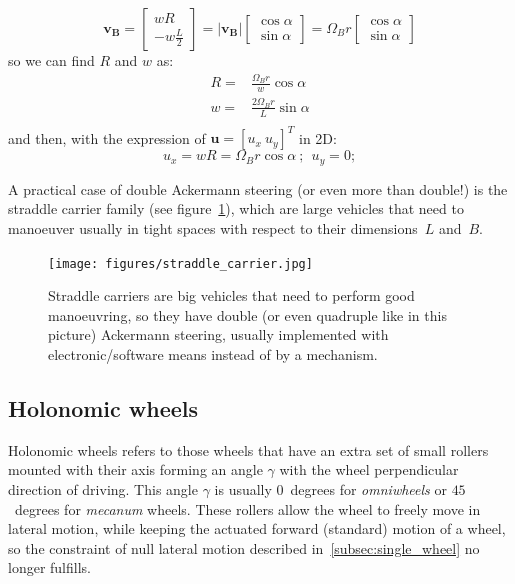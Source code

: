 \begin{equation}
\mathbf{v_B} = 
\left[
 \begin{array}{c}
  wR  \\
  -w\frac{L}{2} 
 \end{array}
\right]
=
|\mathbf{v_B}|
\left[
 \begin{array}{c}
  \cos \alpha  \\
  \sin \alpha
 \end{array}
\right]
=
\Omega_Br
\left[
 \begin{array}{c}
  \cos \alpha  \\
  \sin \alpha
 \end{array}
\right]
\end{equation}
so we can find $R$ and $w$ as: 
\begin{align}
 R = & \frac{\Omega_B r}{w}\cos \alpha \\
 w = & \frac{2\Omega_B r}{L}\sin \alpha \\
\end{align}
and then, with the expression of $\mathbf{u}=\left[u_x\ u_y \right]^T$ in 2D: 
\begin{equation}
 u_x = wR = \Omega_Br \cos \alpha \ ; \ \ u_y = 0; 
\end{equation}

A practical case of double Ackermann steering (or even more than double!) is the straddle carrier family (see figure~\ref{fig:straddle_carrier}), which are large vehicles that need to manoeuver usually in tight spaces with respect to their dimensions~$L$ and~$B$. 
\begin{figure}[bth!]
  \begin{center}
    \texttt{[image: figures/straddle\_carrier.jpg]}
    \caption{Straddle carriers are big vehicles that need to perform good manoeuvring, so they have double (or even quadruple like in this picture) Ackermann steering, usually implemented with electronic/software means instead of by a mechanism.}
    \label{fig:straddle_carrier}
  \end{center}
\end{figure}


\subsection{Holonomic wheels}
Holonomic wheels refers to those wheels that have an extra set of small rollers mounted with their axis forming an angle $\gamma$ with the wheel perpendicular direction of driving. This angle $\gamma$ is usually $0$~degrees for \textit{omniwheels} or $45$~degrees for \textit{mecanum} wheels. These rollers allow the wheel to freely move in lateral motion, while keeping the actuated forward (standard) motion of a wheel, so the constraint of null lateral motion described in~\ref{subsec:single_wheel} no longer fulfills. 

